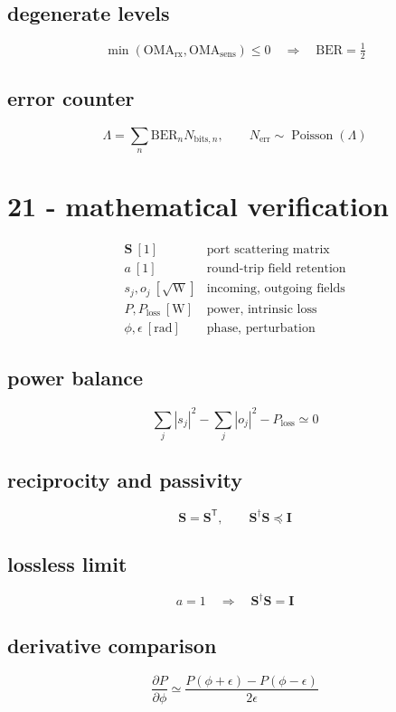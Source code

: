 \subsection*{degenerate levels}
\[
\displaystyle \min(\mathrm{OMA}_{\mathrm{rx}},\mathrm{OMA}_{\mathrm{sens}})\le0\quad\Rightarrow\quad\mathrm{BER}=\tfrac12
\]

\subsection*{error counter}
\[
\displaystyle \Lambda=\sum_n\mathrm{BER}_n N_{\mathrm{bits},n},\qquad N_{\mathrm{err}}\sim\operatorname{Poisson}(\Lambda)
\]

\clearpage
\section*{21 - mathematical verification}

\[
\begin{array}{ll}\mathbf S\ [1]&\text{port scattering matrix}\\[0.6em]a\ [1]&\text{round-trip field retention}\\[0.6em]s_j,o_j\ [\sqrt{\mathrm W}]&\text{incoming, outgoing fields}\\[0.6em]P,P_{\mathrm{loss}}\ [\mathrm W]&\text{power, intrinsic loss}\\[0.6em]\phi,\epsilon\ [\mathrm{rad}]&\text{phase, perturbation}\end{array}
\]

\subsection*{power balance}
\[
\displaystyle \sum_j|s_j|^2-\sum_j|o_j|^2-P_{\mathrm{loss}}\simeq0
\]

\subsection*{reciprocity and passivity}
\[
\displaystyle \mathbf S=\mathbf S^{\mathsf T},\qquad\mathbf S^\dagger\mathbf S\preceq\mathbf I
\]

\subsection*{lossless limit}
\[
\displaystyle a=1\quad\Longrightarrow\quad\mathbf S^\dagger\mathbf S=\mathbf I
\]

\subsection*{derivative comparison}
\[
\displaystyle \frac{\partial P}{\partial\phi}\simeq\frac{P(\phi+\epsilon)-P(\phi-\epsilon)}{2\epsilon}
\]

